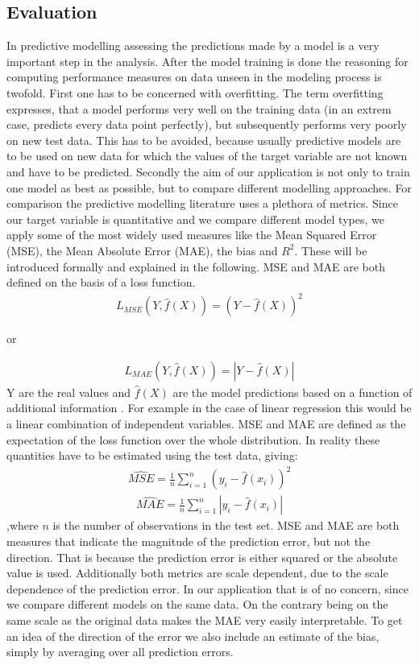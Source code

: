 \subsection{Evaluation}\label{sec:Evaluation_Theory}
In predictive modelling assessing the predictions made by a model is a very important step in the analysis. After the model training is done the reasoning for computing performance measures on data unseen in the modeling process is twofold. First one has to be concerned with overfitting. The term overfitting expresses, that a model performs very well on the training data (in an extrem case, predicts every data point perfectly), but subsequently performs very poorly on new test data. This has to be avoided, because usually predictive models are to be used on new data for which the values of the target variable are not known and have to be predicted. Secondly the aim of our application is not only to train one model as best as possible, but to compare different modelling approaches. For comparison the predictive modelling literature uses a plethora of metrics. Since our target variable is quantitative and we compare different model types, we apply some of the most widely used measures like the Mean Squared Error (MSE), the Mean Absolute Error (MAE), the bias and $R^2$. These will be introduced formally and explained in the following. MSE and MAE are both defined on the basis of a loss function. 
\begin{align}
L_{MSE}(Y,\hat{f}(X))=(Y-\hat{f}(X))^2
\end{align}
\begin{center}
or
\end{center}
\begin{align*}
L_{MAE}(Y,\hat{f}(X))=|Y-\hat{f}(X)|
\end{align*}
Y are the real values and $\hat{f}(X)$ are the model predictions based on a function of additional information \citep[see][pp. 219-220]{friedman_elements_2001}. For example in the case of linear regression this would be a linear combination of independent variables. MSE and MAE are defined as the expectation of the loss function over the whole distribution. In reality these quantities have to be estimated using the test data, giving:
\begin{align}
\hat{MSE}=\frac{1}{n}\sum_{i=1}^n(y_i-\hat{f}(x_i))^2
\end{align}
\begin{align}
\hat{MAE}=\frac{1}{n}\sum_{i=1}^n|y_i-\hat{f}(x_i)|
\end{align}
,where $n$ is the number of observations in the test set. MSE and MAE are both measures that indicate the magnitude of the prediction error, but not the direction. That is because the prediction error is either squared or the absolute value is used. Additionally both metrics are scale dependent, due to the scale dependence of the prediction error. In our application that is of no concern, since we compare different models on the same data. On the contrary being on the same scale as the original data makes the MAE very easily interpretable. To get an idea of the direction of the error we also include an estimate of the bias, simply by averaging over all prediction errors.

